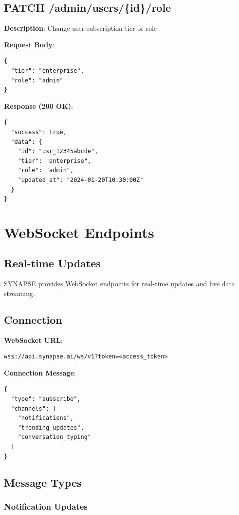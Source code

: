 \documentclass[12pt,a4paper]{report}
\begin{document}
\section{PATCH /admin/users/\{id\}/role}

\textbf{Description}: Change user subscription tier or role

\textbf{Request Body}:
\begin{lstlisting}
{
  "tier": "enterprise",
  "role": "admin"
}
\end{lstlisting}

\textbf{Response (200 OK)}:
\begin{lstlisting}
{
  "success": true,
  "data": {
    "id": "usr_12345abcde",
    "tier": "enterprise",
    "role": "admin",
    "updated_at": "2024-01-20T10:30:00Z"
  }
}
\end{lstlisting}

\chapter{WebSocket Endpoints}

\section{Real-time Updates}

SYNAPSE provides WebSocket endpoints for real-time updates and live data streaming.

\section{Connection}

\textbf{WebSocket URL}:
\begin{lstlisting}
wss://api.synapse.ai/ws/v1?token=<access_token>
\end{lstlisting}

\textbf{Connection Message}:
\begin{lstlisting}
{
  "type": "subscribe",
  "channels": [
    "notifications",
    "trending_updates",
    "conversation_typing"
  ]
}
\end{lstlisting}

\section{Message Types}

\subsection{Notification Updates}
\end{document}
